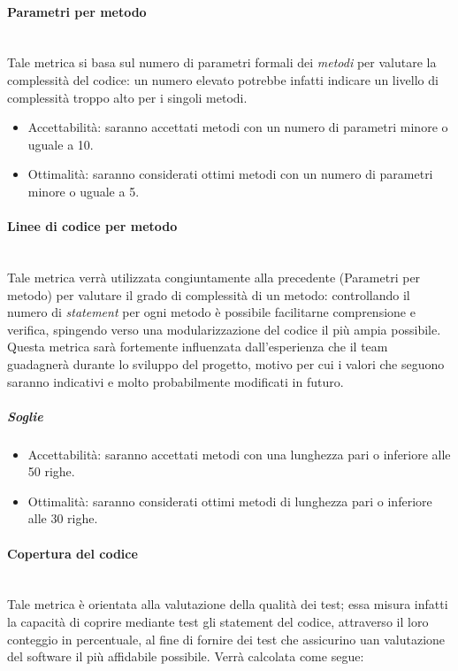 \paragraph{Parametri per metodo}
	~\\Tale metrica si basa sul numero di parametri formali dei \emph{metodi} per valutare la complessità del codice: un numero elevato potrebbe infatti indicare un livello di complessità troppo alto per i singoli metodi.

	\begin{itemize}
	\item Accettabilità: saranno accettati metodi con un numero di parametri minore o uguale a 10.
	\item Ottimalità: saranno considerati ottimi metodi con un numero di parametri minore o uguale a 5.
	\end{itemize}

\paragraph{Linee di codice per metodo}
	~\\Tale metrica verrà utilizzata congiuntamente alla precedente (Parametri per metodo) per valutare il grado di complessità di un metodo: controllando il numero di \emph{statement} per ogni metodo è possibile facilitarne comprensione e verifica, spingendo verso una modularizzazione del codice il più ampia possibile. 
Questa metrica sarà fortemente influenzata dall'esperienza che il team guadagnerà durante lo sviluppo del progetto, motivo per cui i valori che seguono saranno indicativi e molto probabilmente modificati in futuro.

\subparagraph{Soglie}
	\begin{itemize}
	\item Accettabilità: saranno accettati metodi con una lunghezza pari o inferiore alle  50 righe.
	\item Ottimalità: saranno considerati ottimi metodi di lunghezza pari o inferiore alle 30 righe.
	\end{itemize}

\paragraph{Copertura del codice}
	~\\Tale metrica è orientata alla valutazione della qualità dei test; essa misura infatti la capacità di coprire mediante test gli statement del codice, attraverso il loro conteggio in percentuale, al fine di fornire dei test che assicurino uan valutazione del software il più affidabile possibile. Verrà calcolata come segue:

